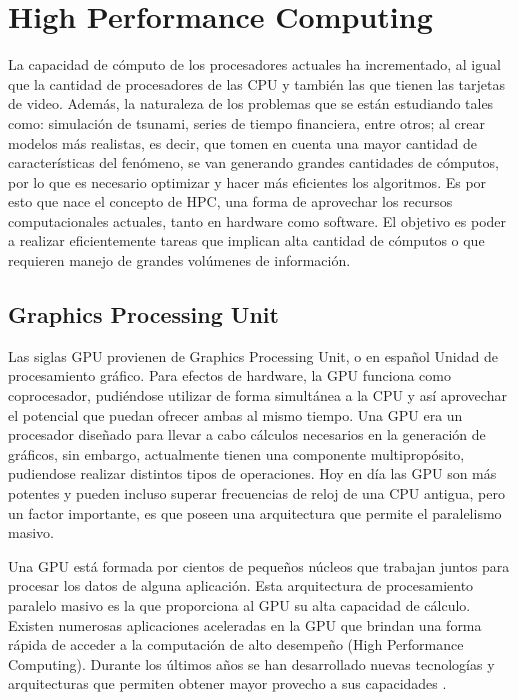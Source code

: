 \section{High Performance Computing}

La capacidad de cómputo de los procesadores actuales ha incrementado, al igual
que la cantidad de procesadores de las CPU y también las que tienen las
tarjetas de video. Además, la naturaleza de los problemas que se están
estudiando tales como: simulación de tsunami, series de tiempo financiera,
entre otros; al crear modelos más realistas, es decir, que tomen en cuenta una
mayor cantidad de características del fenómeno, se van generando grandes
cantidades de cómputos, por lo que es necesario optimizar y hacer más
eficientes los algoritmos. Es por esto que nace el concepto de HPC, una forma
de aprovechar los recursos computacionales actuales, tanto en hardware como
software. El objetivo es poder a realizar eficientemente tareas que implican
alta cantidad de cómputos o que requieren manejo de grandes volúmenes de
información. 

\subsection{Graphics Processing Unit}
Las siglas GPU provienen de Graphics Processing Unit, o en español Unidad de
procesamiento gráfico. Para efectos de hardware, la GPU funciona como
coprocesador, pudiéndose utilizar de forma simultánea a la CPU y así aprovechar
el potencial que puedan ofrecer ambas al mismo tiempo.  Una GPU era un
procesador diseñado para llevar a cabo cálculos necesarios en la generación de
gráficos, sin embargo, actualmente tienen una componente multipropósito,
pudiendose realizar distintos tipos de operaciones. Hoy en día las GPU son más
potentes y pueden incluso superar frecuencias de reloj de una CPU antigua, pero
un factor importante, es que poseen una arquitectura que permite el paralelismo
masivo.

Una GPU está formada por cientos de pequeños núcleos que trabajan juntos para
procesar los datos de alguna aplicación. Esta arquitectura de procesamiento
paralelo masivo es la que proporciona al GPU su alta capacidad de cálculo.
Existen numerosas aplicaciones aceleradas en la GPU que brindan una forma
rápida de acceder a la computación de alto desempeño (High Performance
Computing). Durante los últimos años se han desarrollado nuevas tecnologías y
arquitecturas que permiten obtener mayor provecho a sus capacidades
\cite{owens2007gpu}.

